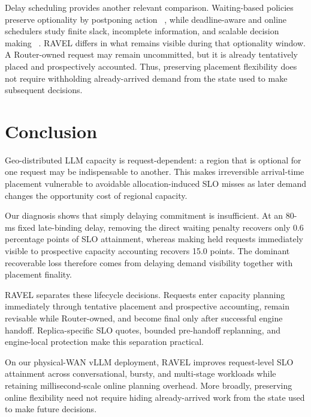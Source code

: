 \documentclass[letterpaper,twocolumn,10pt]{article}
\begin{document}
Delay scheduling provides another relevant comparison.
Waiting-based policies preserve optionality by postponing action
~\cite{delayscheduling}, while deadline-aware and online schedulers study
finite slack, incomplete information, and scalable decision making
~\cite{liu_layland_edf,sparrow,flow_imprecise,omega,firmament}.
RAVEL differs in what remains visible during that optionality window.
A Router-owned request may remain uncommitted, but it is already tentatively
placed and prospectively accounted.
Thus, preserving placement flexibility does not require withholding
already-arrived demand from the state used to make subsequent decisions.

\section{Conclusion}

Geo-distributed LLM capacity is request-dependent: a region that is optional
for one request may be indispensable to another.
This makes irreversible arrival-time placement vulnerable to avoidable
allocation-induced SLO misses as later demand changes the opportunity cost of
regional capacity.

Our diagnosis shows that simply delaying commitment is insufficient.
At an 80-ms fixed late-binding delay, removing the direct waiting penalty
recovers only 0.6 percentage points of SLO attainment, whereas making held
requests immediately visible to prospective capacity accounting recovers
15.0 points.
The dominant recoverable loss therefore comes from delaying demand visibility
together with placement finality.

RAVEL separates these lifecycle decisions.
Requests enter capacity planning immediately through tentative placement and
prospective accounting, remain revisable while Router-owned, and become final
only after successful engine handoff.
Replica-specific SLO quotes, bounded pre-handoff replanning, and engine-local
protection make this separation practical.

On our physical-WAN vLLM deployment, RAVEL improves request-level SLO attainment
across conversational, bursty, and multi-stage workloads while retaining
millisecond-scale online planning overhead.
More broadly, preserving online flexibility need not require hiding
already-arrived work from the state used to make future decisions.
\end{document}
